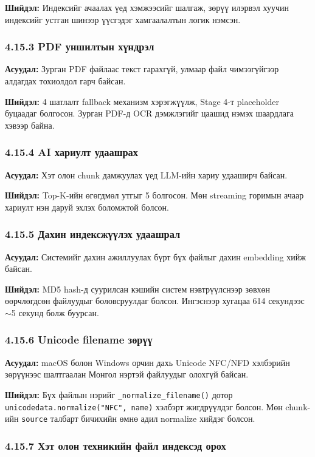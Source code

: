 \documentclass[11pt,a4paper]{article}
\newcommand{\fn}[1]{\nolinkurl{#1}}
\begin{document}
\textbf{Шийдэл:} Индексийг ачаалах үед хэмжээсийг шалгаж, зөрүү илэрвэл хуучин индексийг устган шинээр үүсгэдэг хамгаалалтын логик нэмсэн.

\subsubsection*{4.15.3 PDF уншилтын хүндрэл}

\textbf{Асуудал:} Зурган PDF файлаас текст гарахгүй, улмаар файл чимээгүйгээр алдагдах тохиолдол гарч байсан.

\textbf{Шийдэл:} 4 шатлалт fallback механизм хэрэгжүүлж, Stage 4-т placeholder буцаадаг болгосон. Зурган PDF-д OCR дэмжлэгийг цаашид нэмэх шаардлага хэвээр байна.

\subsubsection*{4.15.4 AI хариулт удаашрах}

\textbf{Асуудал:} Хэт олон chunk дамжуулах үед LLM-ийн хариу удааширч байсан.

\textbf{Шийдэл:} Top-K-ийн өгөгдмөл утгыг 5 болгосон. Мөн streaming горимын ачаар хариулт нэн даруй эхлэх боломжтой болсон.

\subsubsection*{4.15.5 Дахин индексжүүлэх удаашрал}

\textbf{Асуудал:} Системийг дахин ажиллуулах бүрт бүх файлыг дахин embedding хийж байсан.

\textbf{Шийдэл:} MD5 hash-д суурилсан кэшийн систем нэвтрүүлснээр зөвхөн өөрчлөгдсөн файлуудыг боловсруулдаг болсон. Ингэснээр хугацаа 614 секундээс $\sim$5 секунд болж буурсан.

\subsubsection*{4.15.6 Unicode filename зөрүү}

\textbf{Асуудал:} macOS болон Windows орчин дахь Unicode NFC/NFD хэлбэрийн зөрүүнээс шалтгаалан Монгол нэртэй файлуудыг олохгүй байсан.

\textbf{Шийдэл:} Бүх файлын нэрийг \fn{_normalize_filename()} дотор \fn{unicodedata.normalize("NFC", name)} хэлбэрт жигдрүүлдэг болсон. Мөн chunk-ийн \texttt{source} талбарт бичихийн өмнө адил normalize хийдэг болсон.

\subsubsection*{4.15.7 Хэт олон техникийн файл индексэд орох}
\end{document}
